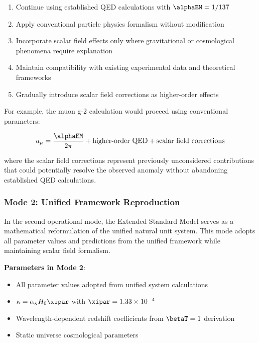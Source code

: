 	\begin{enumerate}
		\item Continue using established QED calculations with $\alphaEM = 1/137$
		\item Apply conventional particle physics formalism without modification
		\item Incorporate scalar field effects only where gravitational or cosmological phenomena require explanation
		\item Maintain compatibility with existing experimental data and theoretical frameworks \cite{Peskin1995}
		\item Gradually introduce scalar field corrections as higher-order effects
	\end{enumerate}
	
	For example, the muon g-2 calculation would proceed using conventional parameters:
	
	\begin{equation}
		a_\mu = \frac{\alphaEM}{2\pi} + \text{higher-order QED} + \text{scalar field corrections}
	\end{equation}
	
	where the scalar field corrections represent previously unconsidered contributions that could potentially resolve the observed anomaly without abandoning established QED calculations.
	
	\subsubsection{Mode 2: Unified Framework Reproduction}
	\label{subsubsec:mode2_unified_reproduction}
	
	In the second operational mode, the Extended Standard Model serves as a mathematical reformulation of the unified natural unit system. This mode adopts all parameter values and predictions from the unified framework while maintaining scalar field formalism.
	
	\textbf{Parameters in Mode 2}:
	\begin{itemize}
		\item All parameter values adopted from unified system calculations
		\item $\kappa = \alpha_\kappa H_0 \xipar$ with $\xipar = 1.33 \times 10^{-4}$
		\item Wavelength-dependent redshift coefficients from $\betaT = 1$ derivation
		\item Static universe cosmological parameters
	\end{itemize}
	
